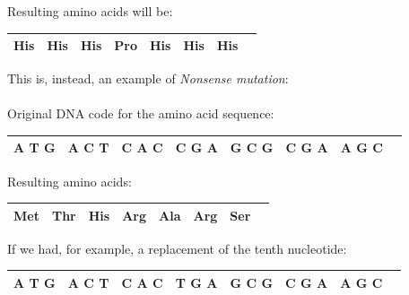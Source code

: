 \vspace{15mm}

Resulting amino acids will be:

\vspace{5mm}

\begin{tabular}{|l|l|l|l|l|l|rl|}
\hline
His         &	His         &	His         &	\textbf{Pro}         &	His         &	His         &	His  	&       \\
\hline
\end{tabular}

\vspace{25mm}

This is, instead, an example of \emph{Nonsense mutation}:
\\
\\Original DNA code for the amino acid sequence:

\vspace{5mm}

\begin{tabular}{|l|l|l|l|l|l|rl|}
\hline
A   T   G         &	A   C   T         &	C   A   C         &	C   G   A         &	G   C   G         &	C   G   A         &	A   G   C  	&       \\
\hline
\end{tabular}

\vspace{15mm}

Resulting amino acids:

\vspace{5mm}

\begin{tabular}{|l|l|l|l|l|l|rl|}
\hline
Met         &	Thr         &	His         &	Arg         &	Ala         &	Arg         &	Ser  	&       \\
\hline
\end{tabular}

\vspace{15mm}

If we had, for example, a replacement of the tenth nucleotide:

\vspace{5mm}

\begin{tabular}{|l|l|l|l|l|l|rl|}
\hline
A   T   G         &	A   C   T         &	C   A   C         &	\textbf{T}   G   A         &	G   C   G         &	C   G   A         &	A   G   C  	&       \\
\hline
\end{tabular}

